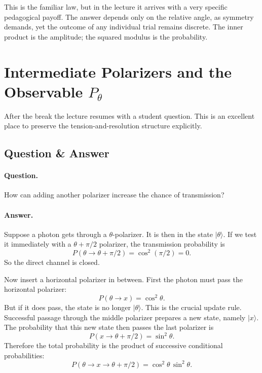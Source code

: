 This is the familiar law, but in the lecture it arrives with a very specific pedagogical payoff. The answer depends only on the relative angle, as symmetry demands, yet the outcome of any individual trial remains discrete. The inner product is the amplitude; the squared modulus is the probability.

\section{Intermediate Polarizers and the Observable \(P_\theta\)}

After the break the lecture resumes with a student question. This is an excellent place to preserve the tension-and-resolution structure explicitly.

\subsection{Question \& Answer}

\paragraph{Question.}
How can adding another polarizer increase the chance of transmission?

\paragraph{Answer.}
Suppose a photon gets through a \(\theta\)-polarizer. It is then in the state \(|\theta\rangle\). If we test it immediately with a \(\theta+\pi/2\) polarizer, the transmission probability is
\begin{equation}
P(\theta\to \theta+\pi/2)=\cos^2(\pi/2)=0.
\end{equation}
So the direct channel is closed.

Now insert a horizontal polarizer in between. First the photon must pass the horizontal polarizer:
\begin{equation}
P(\theta\to x)=\cos^2\theta.
\end{equation}
But if it does pass, the state is no longer \(|\theta\rangle\). This is the crucial update rule. Successful passage through the middle polarizer prepares a new state, namely \(|x\rangle\). The probability that this new state then passes the last polarizer is
\begin{equation}
P(x\to \theta+\pi/2)=\sin^2\theta.
\end{equation}
Therefore the total probability is the product of successive conditional probabilities:
\begin{equation}
P(\theta\to x\to \theta+\pi/2)=\cos^2\theta\,\sin^2\theta.
\end{equation}

